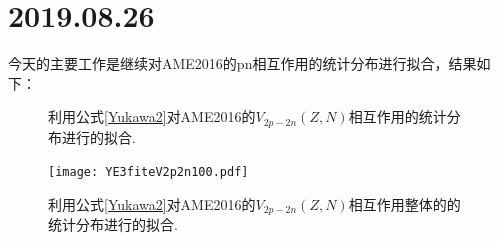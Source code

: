 \section{2019.08.26}
今天的主要工作是继续对AME2016的pn相互作用的统计分布进行拟合，结果如下：
\begin{figure}[H]
\centering
{}
\qquad
{}
\caption{利用公式\ref{Yukawa2}对AME2016的$V_{2p-2n}(Z,N)$相互作用的统计分布进行的拟合.\label{fig_YE3FitV2p2n_1}}
\end{figure}
\begin{figure}[H]
\centering
\texttt{[image: YE3fiteV2p2n100.pdf]}
\caption{利用公式\ref{Yukawa2}对AME2016的$V_{2p-2n}(Z,N)$相互作用整体的的统计分布进行的拟合.\label{fig_YE3FitV2p2n}}
\end{figure}
